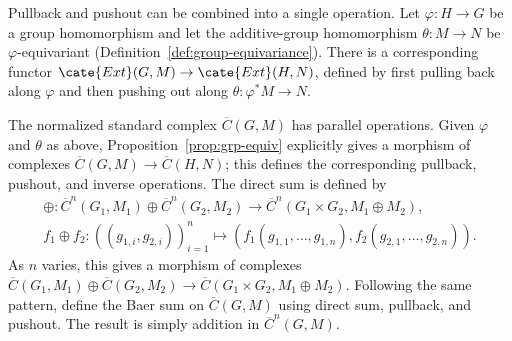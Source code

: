 Pullback and pushout can be combined into a single operation. Let
$\varphi:H\to G$ be a group homomorphism and let the additive-group
homomorphism $\theta:M\to N$ be $\varphi$-equivariant
(Definition~\ref{def:group-equivariance}). There is a corresponding functor
$\cate{Ext}(G,M)\to\cate{Ext}(H,N)$, defined by first pulling back along
$\varphi$ and then pushing out along $\theta:\varphi^*M\to N$.

The normalized standard complex $\overline{C}(G,M)$ has parallel operations.
Given $\varphi$ and $\theta$ as above, Proposition~\ref{prop:grp-equiv}
explicitly gives a morphism of complexes
$\overline{C}(G,M)\to\overline{C}(H,N)$; this defines the corresponding
pullback, pushout, and inverse operations. The direct sum is defined by
\begin{gather*}
	\oplus:\overline{C}^n(G_1,M_1)\oplus\overline{C}^n(G_2,M_2)
	\to\overline{C}^n(G_1\times G_2,M_1\oplus M_2),\\
	f_1\oplus f_2:((g_{1,i},g_{2,i}))_{i=1}^n\mapsto
	\left(f_1(g_{1,1},\ldots,g_{1,n}),
	f_2(g_{2,1},\ldots,g_{2,n})\right).
\end{gather*}
As $n$ varies, this gives a morphism of complexes
$\overline{C}(G_1,M_1)\oplus\overline{C}(G_2,M_2)
\to\overline{C}(G_1\times G_2,M_1\oplus M_2)$. Following the same pattern,
define the Baer sum on $\overline{C}(G,M)$ using direct sum, pullback, and
pushout. The result is simply addition in $\overline{C}^n(G,M)$.

